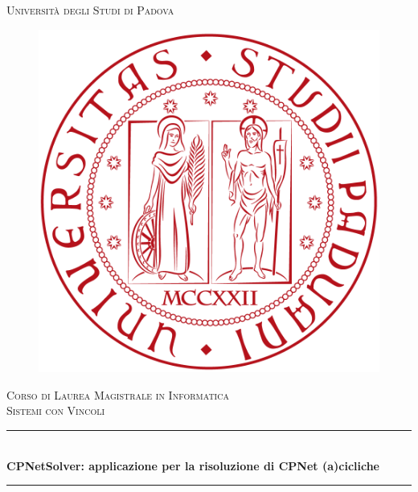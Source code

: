 \documentclass[12pt]{article} %
\begin{document}

\begin{titlepage}

\newcommand{\HRule}{\rule{\linewidth}{0.5mm}} %

\center %

\textsc{\LARGE Università degli Studi di Padova}\\[1.5cm] %

\begin{figure}[htbp]
    \centering
      \includegraphics[scale=0.25]{unipd.png}
\end{figure}

\textsc{\Large Corso di Laurea Magistrale in Informatica}\\[0.5cm] %
\textsc{\large Sistemi con Vincoli}\\[0.5cm] %

\HRule \\[0.4cm]
{ \large \bfseries CPNetSolver: applicazione per la risoluzione di CPNet (a)cicliche}\\[0.4cm] %
\HRule \\[1.5cm]


\end{titlepage}
\end{document}
